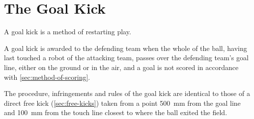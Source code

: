\section{The Goal Kick}\label{sec:goal-kick}

A goal kick is a method of restarting play.

A goal kick is awarded to the defending team when the whole of the ball, having last touched a
robot of the attacking team, passes over the defending team's goal line, either on the ground or
in the air, and a goal is not scored in accordance with \autoref{sec:method-of-scoring}.

The procedure, infringements and rules of the goal kick are identical to those of a direct free
kick (\autoref{sec:free-kicks}) taken from a point 500 \,mm from the goal line and 100 \,mm
from the touch line closest to where the ball exited the field.
